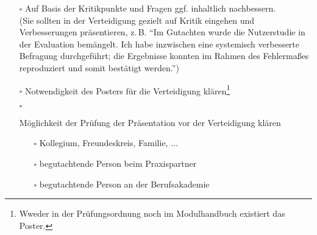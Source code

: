 \begin{itemize}
{\begin{itemize}
{\begin{itemize}
                \end{itemize}
            }
            \item[$\square$]{
                Auf Basis der Kritikpunkte und Fragen ggf. inhaltlich nachbessern.\\
                (Sie sollten in der Verteidigung gezielt auf Kritik eingehen und Verbesserungen präsentieren, z.\,B. \enquote{Im Gutachten wurde die Nutzerstudie in der Evaluation bemängelt. Ich habe inzwischen eine systemisch verbesserte Befragung durchgeführt; die Ergebnisse konnten im Rahmen des Fehlermaßes reproduziert und somit bestätigt werden.})
            }         
            \item[$\square$] Notwendigkeit des Posters für die Verteidigung klären\footnote{Wweder in der Prüfungsordnung noch im Modulhandbuch existiert das Poster.}
            \item[$\square$]{
                Möglichkeit der Prüfung der Präsentation vor der Verteidigung klären
                \begin{itemize}
                    \item[$\square$] Kollegium, Freundeskreis, Familie, $\ldots$
                    \item[$\square$] begutachtende Person beim Praxispartner
                    \item[$\square$] begutachtende Person an der Berufsakademie
                \end{itemize}
            }
        \end{itemize}
    }
\end{itemize}